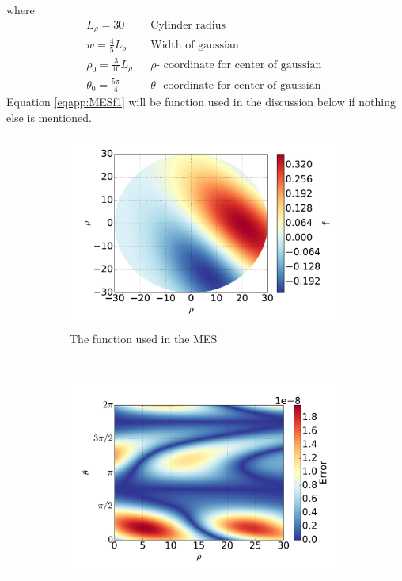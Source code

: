 %
where
%
\begin{align*}
    &L_\rho = 30&
    &\text{
        Cylinder radius
    }&
    \\
    &w = \frac{4}{5}L_\rho&
    &\text{
        Width of gaussian
    }&
    \\
    &\rho_0 = \frac{3}{10}L_\rho&
    &
    \rho
    \text{
        - coordinate for center of gaussian
    }&
    \\
    &\theta_0 = \frac{5\pi}{4}&
    &
    \theta
    \text{
        - coordinate for center of gaussian
    }&
\end{align*}
%
Equation \ref{eqapp:MESf1} will be function used in the discussion below if
nothing else is mentioned.
%
\begin{figure}[t!]
    \centering
    \begin{subfigure}[t]{0.45\textwidth}
        \centering
        \includegraphics[width=1.0\textwidth]{fig/f}
        \caption{The function used in the MES}
    \end{subfigure}%
    ~
    \begin{subfigure}[t]{0.45\textwidth}
        \centering
        \includegraphics[width=1.0\textwidth]{fig/err}

\end{subfigure}
\end{figure}

